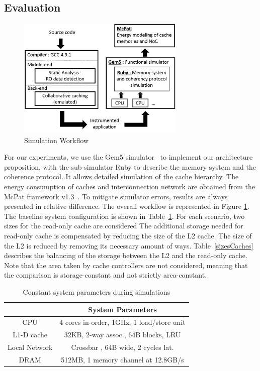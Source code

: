 \documentclass[sigconf]{acmart}
\begin{document}
\subsection{Evaluation}

\begin{figure}
    \centering
    \includegraphics[width=8cm]{./images/workflow.png}
    \caption{Simulation Workflow}
    \label{workflow}
\end{figure}

For our experiments, we use the Gem5 simulator~\cite{Binkert:2011} to
implement our architecture proposition, with the sub-simulator Ruby to
describe the memory system and the coherence protocol. It allows
detailed simulation of the cache hierarchy. The energy consumption of
caches and interconnection network are obtained from the McPat
framework v1.3~\cite{Li:2009}. To mitigate simulator errors, results
are always presented in relative difference. The overall workflow is
represented in Figure \ref{workflow}. The baseline system
configuration is shown in Table~\ref{designs}. For each scenario, two
sizes for the read-only cache are considered
The additional storage needed for read-only cache is compensated by
reducing the size of the L2 cache. The size of the L2 is reduced by
removing its necessary amount of ways. Table~\ref{sizesCaches}
describes the balancing of the storage between the L2 and the
read-only cache. Note that the area taken by cache controllers are not
considered, meaning that the comparison is storage-constant and not
strictly area-constant.

\begin{table}
\centering
\caption{Constant system parameters during simulations}
\label{designs}
\begin{tabular}{ | c | c | }
\hline
\hline
 & System Parameters \\
\hline
CPU & 4 cores in-order, 1GHz, 1 load/store unit\\
\hline
L1-D cache & 32KB, 2-way assoc., 64B blocks, LRU\\
\hline
Local Network& Crossbar , 64B wide, 2 cycles lat.\\
\hline
DRAM  & 512MB, 1 memory channel at 12.8GB/s\\
\hline
\hline
\end{tabular}
\end{table}
\end{document}
